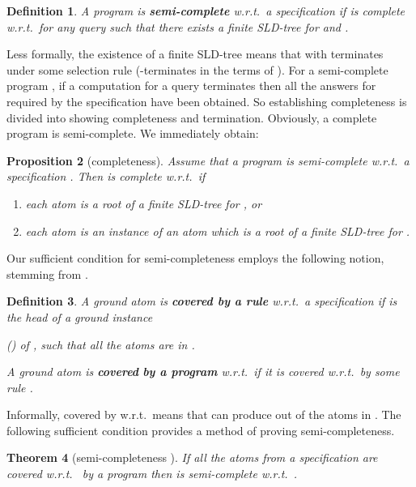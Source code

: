\documentclass{tlp}
\newtheorem{theorem}{Theorem}
\newtheorem{proposition}[theorem]{Proposition}
\newtheorem{definition}[theorem]{Definition}
\begin{document}
\pagebreak[3]
\begin{definition}
\nopagebreak
A program  is {\bf semi-complete} 
w.r.t.\ a specification  if
 is complete w.r.t.\  for any query 
such that there exists a finite SLD-tree for  and .
\end{definition}


Less formally, the existence of a finite SLD-tree means
that  with  terminates under some selection rule
(-terminates in the terms of \cite{PedreschiRS02.TPLP.terminating}).
For a semi-complete program , if a computation for a query 
terminates then all the answers for  required by the specification have
been obtained.
So establishing completeness is divided into showing completeness and
termination. 
Obviously, a complete program is semi-complete.
We immediately obtain:
\begin{proposition}[completeness]
\label{prop:completeness:trivial}
Assume that a program  is semi-complete w.r.t.\ a specification .
Then  is complete w.r.t.\   if
  \begin{enumerate}
  \item each atom  is a root of a finite SLD-tree for , or
  \item each atom  is an instance of an atom  which is a root of a
    finite SLD-tree for .
  \end{enumerate}
\end{proposition}
\pagebreak[3]

Our sufficient condition for semi-completeness employs the
following notion, stemming from \cite{Shapiro.book}.
\begin{definition}
  A ground atom  is
  {\bf covered by a rule}  w.r.t.\ a specification 
if  is the head of a ground instance  
  
  () of , such that all the atoms  are in .




  A ground atom  is {\bf covered} {\bf by a program}  w.r.t.\ 
  if it is covered w.r.t.\  by some rule .
\end{definition}

Informally,  covered by  w.r.t.\  means that  can produce  out
of the atoms in .
The following sufficient condition provides a method of proving
semi-completeness. 

\begin{theorem}[semi-completeness {\rm\cite{drabent.tocl16}}]
\label{th:semi-complete}
If all the atoms from a specification  are covered w.r.t.~
 by a program  
then  is semi-complete w.r.t.~.
\end{theorem}
\end{document}
